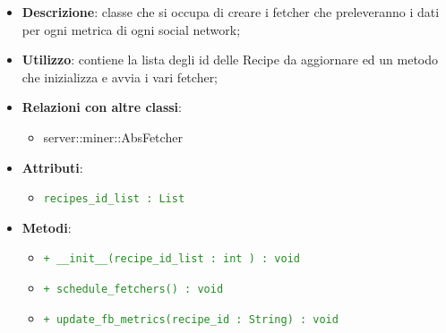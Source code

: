 			\begin{itemize}
				\item \textbf{Descrizione}: classe che si occupa di creare i fetcher che preleveranno i dati per ogni metrica di ogni social network;
				\item \textbf{Utilizzo}: contiene la lista degli id delle Recipe da aggiornare ed un metodo che inizializza e avvia i vari fetcher;
				\item \textbf{Relazioni con altre classi}:
					\begin{itemize}
						\item server::miner::AbsFetcher
					\end{itemize}
				\item \textbf{Attributi}:
					\begin{itemize}
						\item \textcolor{forestgreen}{\texttt{recipes\_id\_list : List}}
					\end{itemize}
				\item \textbf{Metodi}:   
					\begin{itemize}
						\item \textcolor{forestgreen}{\texttt{+ \_\_init\_\_(recipe\_id\_list : int ) : void}}
						\item \textcolor{forestgreen}{\texttt{+ schedule\_fetchers() : void}}
						\item \textcolor{forestgreen}{\texttt{+ update\_fb\_metrics(recipe\_id : String) : void}}

\end{itemize}
\end{itemize}
